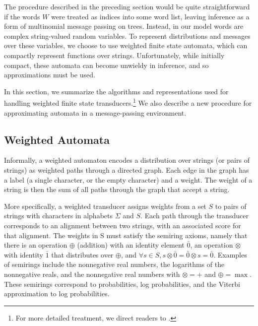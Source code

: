 \documentclass[11pt,a4paper]{article}
\begin{document}
The procedure described in the preceding section would be quite
straightforward if the words $W$ were treated as indices into some
word list, leaving inference as a form of multinomial message passing
on trees. Instead, in our model words are complex string-valued
random variables. To represent distributions and messages over
these variables, we choose to use weighted finite state automata,
which can compactly represent functions over strings. Unfortunately,
while initially compact, these automata can become unwieldy in
inference, and so approximations must be used.

In this section, we summarize the algorithms and representations
used for handling weighted finite state transducers.\footnote{For
more detailed treatment, we direct readers to .}
We also describe a new procedure for approximating automata in a
message-passing environment.

\subsection{Weighted Automata}

Informally, a weighted automaton encodes a distribution over strings
(or pairs of strings) as weighted paths through a directed graph.
Each edge in the graph has a label (a single character, or the empty
character) and a weight. The weight of a string is then the sum
of all paths through the graph that accept a string.

More specifically, a weighted transducer assigns weights from a set
$S$ to pairs of strings with characters in alphabets $\Sigma$ and
$S$. Each path through the transducer corresponds to an alignment
between two strings, with an associated score for that alignment.
The weights in S must satisfy the semiring axioms, namely that there
is an operation $\oplus$ (addition) with an identity element $\bar
0$, an operation $\otimes$ with identity $\bar 1$ that distributes
over $\oplus$, and $\forall s\in S, s\otimes \bar 0 = \bar 0 \otimes
s = \bar 0$. Examples of semirings include the nonnegative real
numbers, the logarithms of the nonnegative reals, and the nonnegative
real numbers with $\otimes = +$ and $\oplus = \max$. These semirings
correspond to probabilities, log probabilities, and the Viterbi
approximation to log probabilities.

\end{document}
